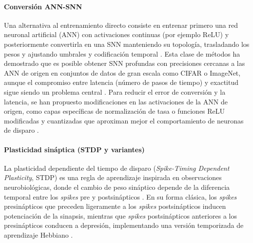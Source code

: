 \paragraph{Conversión ANN-SNN}
Una alternativa al entrenamiento directo consiste en entrenar primero una red neuronal artificial (ANN) con activaciones continuas (por ejemplo ReLU) y posteriormente convertirla en una SNN manteniendo su topología, trasladando los pesos y ajustando umbrales y codificación temporal \cite{Jiang2023anntosnn, Schuman2022Opportunities}. Esta clase de métodos ha demostrado que es posible obtener SNN profundas con precisiones cercanas a las ANN de origen en conjuntos de datos de gran escala como CIFAR \cite{cifar-10} o ImageNet, aunque el compromiso entre latencia (número de pasos de tiempo) y exactitud sigue siendo un problema central \cite{Ding2021anntosnnoptimal, Gao2023anntosnnbipolarlif}. Para reducir el error de conversión y la latencia, se han propuesto modificaciones en las activaciones de la ANN de origen, como capas específicas de normalización de tasa o funciones ReLU modificadas y cuantizadas que aproximan mejor el comportamiento de neuronas de disparo \cite{Ding2021anntosnnoptimal}.


\paragraph{Plasticidad sináptica (STDP y variantes)}
La plasticidad dependiente del tiempo de disparo (\textit{Spike-Timing Dependent Plasticity}, STDP) es una regla de aprendizaje inspirada en observaciones neurobiológicas, donde el cambio de peso sináptico depende de la diferencia temporal entre los \textit{spikes} pre y postsinápticos \cite{RAHMAN2025stdp}. En su forma clásica, los \textit{spikes} presinápticos que preceden ligeramente a los \textit{spikes} postsinápticos inducen potenciación de la sinapsis, mientras que \textit{spikes} postsinápticos anteriores a los presinápticos conducen a depresión, implementando una versión temporizada de aprendizaje Hebbiano \cite{Moisy2006snnsurvey, RAHMAN2025stdp}.

